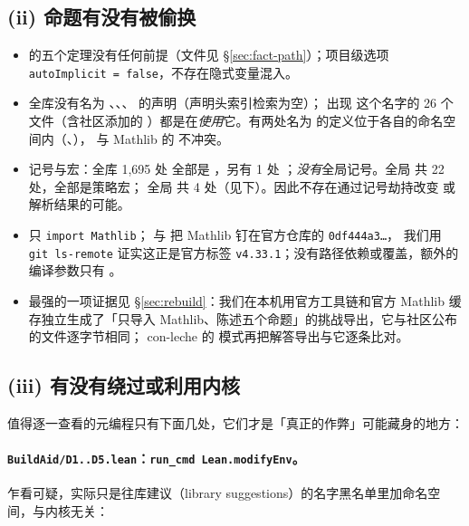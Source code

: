 \subsection{(ii) 命题有没有被偷换}

\begin{itemize}
\item {} 的五个定理没有任何前提（文件见 \S\ref{sec:fact-path}）；项目级选项 \texttt{autoImplicit = false}，不存在隐式变量混入。
\item 全库没有名为 、、、 的声明（声明头索引检索为空）；
出现  这个名字的 26 个文件（含社区添加的 ）都是在\emph{使用}它。有两处名为  的定义位于各自的命名空间内（、），
与 Mathlib 的  不冲突。
\item 记号与宏：全库 1,695 处  全部是 ，另有 1 处 ；\emph{没有}全局记号。全局  共 22 处，全部是策略宏；
全局  共 4 处（见下）。因此不存在通过记号劫持改变  或  解析结果的可能。
\item {} 只 \texttt{import Mathlib}； 与  把 Mathlib 钉在官方仓库的 \texttt{0df444a3…}，
我们用 \texttt{git ls-remote} 证实这正是官方标签 \texttt{v4.33.1}；没有路径依赖或覆盖，额外的编译参数只有 。
\item 最强的一项证据见 \S\ref{sec:rebuild}：我们在本机用官方工具链和官方 Mathlib 缓存独立生成了「只导入 Mathlib、陈述五个命题」的挑战导出，它与社区公布的文件逐字节相同；
con-leche 的  模式再把解答导出与它逐条比对。
\end{itemize}

\subsection{(iii) 有没有绕过或利用内核}

值得逐一查看的元编程只有下面几处，它们才是「真正的作弊」可能藏身的地方：

\paragraph{\texttt{BuildAid/D1..D5.lean}：\texttt{run\_cmd Lean.modifyEnv}。}乍看可疑，实际只是往库建议（library suggestions）的名字黑名单里加命名空间，与内核无关：


